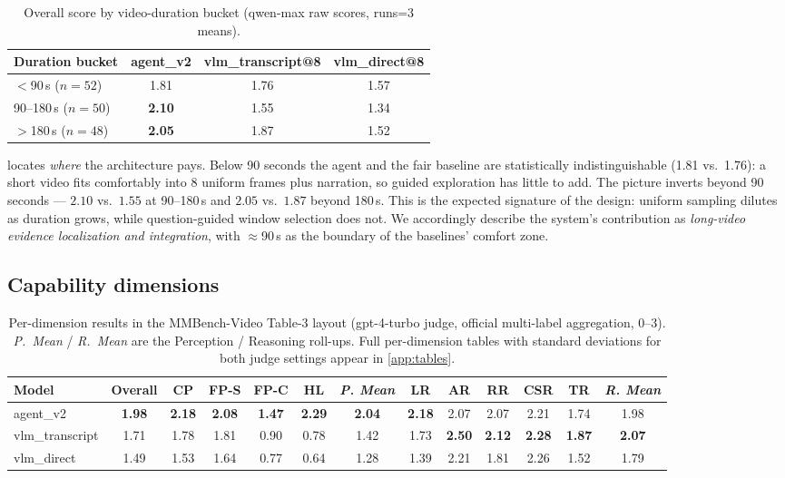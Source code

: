 \begin{table}[t]
  \centering
  \small
  \caption{Overall score by video-duration bucket (qwen-max raw scores, runs=3
  means).}
  \label{tab:duration}
  \begin{tabular}{@{}lccc@{}}
    \toprule
    Duration bucket & agent\_v2 & vlm\_transcript@8 & vlm\_direct@8 \\
    \midrule
    $<$90\,s \hfill ($n=52$) & 1.81 & 1.76 & 1.57 \\
    90--180\,s \hfill ($n=50$) & \textbf{2.10} & 1.55 & 1.34 \\
    $>$180\,s \hfill ($n=48$) & \textbf{2.05} & 1.87 & 1.52 \\
    \bottomrule
  \end{tabular}
\end{table}

 locates \emph{where} the architecture pays. Below 90 seconds
the agent and the fair baseline are statistically indistinguishable (1.81 vs.\
1.76): a short video fits comfortably into 8 uniform frames plus narration, so
guided exploration has little to add. The picture inverts beyond 90 seconds ---
$2.10$ vs.\ $1.55$ at 90--180\,s and $2.05$ vs.\ $1.87$ beyond 180\,s. This is the
expected signature of the design: uniform sampling dilutes as duration grows, while
question-guided window selection does not. We accordingly describe the system's
contribution as \emph{long-video evidence localization and integration}, with
$\approx$90\,s as the boundary of the baselines' comfort zone.

\subsection{Capability dimensions}
\label{subsec:dimensions}

\begin{table}[t]
  \centering
  \small
  \caption{Per-dimension results in the MMBench-Video Table-3 layout
  (gpt-4-turbo judge, official multi-label aggregation, 0--3). \emph{P.\ Mean} /
  \emph{R.\ Mean} are the Perception / Reasoning roll-ups. Full per-dimension
  tables with standard deviations for both judge settings appear in
  \cref{app:tables}.}
  \label{tab:dimensions}
  \footnotesize
  \setlength{\tabcolsep}{3.2pt}
  \begin{tabular}{@{}lcccccccccccc@{}}
    \toprule
    Model & Overall & CP & FP-S & FP-C & HL & \emph{P. Mean} & LR & AR & RR & CSR & TR & \emph{R. Mean} \\
    \midrule
    agent\_v2 & \textbf{1.98} & \textbf{2.18} & \textbf{2.08} & \textbf{1.47} & \textbf{2.29} & \textbf{2.04} & \textbf{2.18} & 2.07 & 2.07 & 2.21 & 1.74 & 1.98 \\
    vlm\_transcript & 1.71 & 1.78 & 1.81 & 0.90 & 0.78 & 1.42 & 1.73 & \textbf{2.50} & \textbf{2.12} & \textbf{2.28} & \textbf{1.87} & \textbf{2.07} \\
    vlm\_direct & 1.49 & 1.53 & 1.64 & 0.77 & 0.64 & 1.28 & 1.39 & 2.21 & 1.81 & 2.26 & 1.52 & 1.79 \\
    \bottomrule
  \end{tabular}
\end{table}

